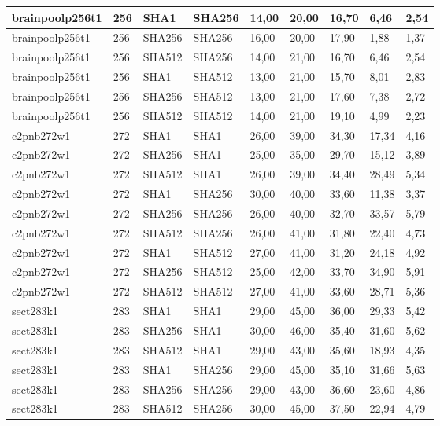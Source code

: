 \begin{longtable}{| l | l | l | l | l |l |l |l |l |}
brainpoolp256t1 & 256 & SHA1 & SHA256 & 14,00 & 20,00 & 16,70 & 6,46 & 2,54 \\ \hline 
brainpoolp256t1 & 256 & SHA256 & SHA256 & 16,00 & 20,00 & 17,90 & 1,88 & 1,37 \\ \hline 
brainpoolp256t1 & 256 & SHA512 & SHA256 & 14,00 & 21,00 & 16,70 & 6,46 & 2,54 \\ \hline 
brainpoolp256t1 & 256 & SHA1 & SHA512 & 13,00 & 21,00 & 15,70 & 8,01 & 2,83 \\ \hline 
brainpoolp256t1 & 256 & SHA256 & SHA512 & 13,00 & 21,00 & 17,60 & 7,38 & 2,72 \\ \hline 
brainpoolp256t1 & 256 & SHA512 & SHA512 & 14,00 & 21,00 & 19,10 & 4,99 & 2,23 \\ \hline 
c2pnb272w1 & 272 & SHA1 & SHA1 & 26,00 & 39,00 & 34,30 & 17,34 & 4,16 \\ \hline 
c2pnb272w1 & 272 & SHA256 & SHA1 & 25,00 & 35,00 & 29,70 & 15,12 & 3,89 \\ \hline 
c2pnb272w1 & 272 & SHA512 & SHA1 & 26,00 & 39,00 & 34,40 & 28,49 & 5,34 \\ \hline 
c2pnb272w1 & 272 & SHA1 & SHA256 & 30,00 & 40,00 & 33,60 & 11,38 & 3,37 \\ \hline 
c2pnb272w1 & 272 & SHA256 & SHA256 & 26,00 & 40,00 & 32,70 & 33,57 & 5,79 \\ \hline 
c2pnb272w1 & 272 & SHA512 & SHA256 & 26,00 & 41,00 & 31,80 & 22,40 & 4,73 \\ \hline 
c2pnb272w1 & 272 & SHA1 & SHA512 & 27,00 & 41,00 & 31,20 & 24,18 & 4,92 \\ \hline 
c2pnb272w1 & 272 & SHA256 & SHA512 & 25,00 & 42,00 & 33,70 & 34,90 & 5,91 \\ \hline 
c2pnb272w1 & 272 & SHA512 & SHA512 & 27,00 & 41,00 & 33,60 & 28,71 & 5,36 \\ \hline 
sect283k1 & 283 & SHA1 & SHA1 & 29,00 & 45,00 & 36,00 & 29,33 & 5,42 \\ \hline 
sect283k1 & 283 & SHA256 & SHA1 & 30,00 & 46,00 & 35,40 & 31,60 & 5,62 \\ \hline 
sect283k1 & 283 & SHA512 & SHA1 & 29,00 & 43,00 & 35,60 & 18,93 & 4,35 \\ \hline 
sect283k1 & 283 & SHA1 & SHA256 & 29,00 & 45,00 & 35,10 & 31,66 & 5,63 \\ \hline 
sect283k1 & 283 & SHA256 & SHA256 & 29,00 & 43,00 & 36,60 & 23,60 & 4,86 \\ \hline 
sect283k1 & 283 & SHA512 & SHA256 & 30,00 & 45,00 & 37,50 & 22,94 & 4,79 \\ \hline 

\end{longtable}
